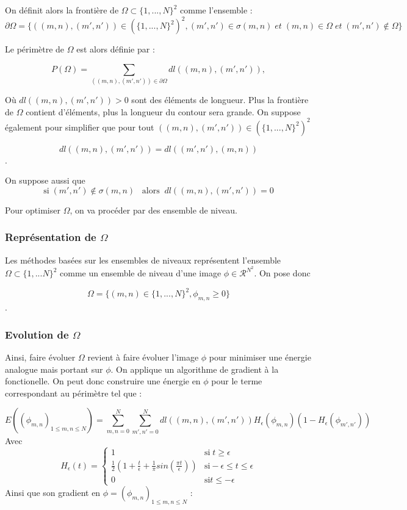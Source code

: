 On définit alors la frontière de $\Omega \subset \{ 1,...,N\}^2$ comme l'ensemble : 
\[ \partial \Omega = \{ ((m,n),(m',n')) \in (\{ 1,...,N\}^2)^2, (m',n') \in \sigma (m,n) \; et \; (m,n)\in \Omega \; et \; (m',n') \notin \Omega \}\] 

Le périmètre de $\Omega$ est alors définie par : 

\[ P(\Omega) = \sum \limits_{((m,n),(m',n')) \in \partial \Omega} dl((m,n),(m',n')),\] 

Où $ dl((m,n),(m',n')) > 0$ sont des éléments de longueur. Plus la frontière de $\Omega$ contient d'éléments, plus la longueur du contour sera grande. On suppose également pour simplifier que pour tout $((m,n), (m',n')) \in (\{ 1,...,N\}^2)^2$ 

\[ dl((m,n),(m',n')) = dl((m',n'),(m,n))\].

On suppose aussi que 
\[ \text{si} \; (m',n') \notin \sigma (m,n) \; \; \; \text{alors} \; \; dl((m,n),(m',n')) = 0\]

Pour optimiser $\Omega$, on va procéder par des ensemble de niveau.
 
\subsubsection{Représentation de \texorpdfstring{$\Omega$}{Lg}}

Les méthodes basées sur les ensembles de niveaux représentent l'ensemble $\Omega \subset \{1,...N\}^2$ comme un ensemble de niveau d'une image $\phi \in \mathcal{R}^{N^2}$. On pose donc 

\[ \Omega = \{ (m,n) \in \{1,...,N \}^2, \phi_{m,n} \geq 0 \} \].

\subsubsection{Evolution de \texorpdfstring{$\Omega$}{Lg}}

Ainsi, faire évoluer $\Omega$ revient à faire évoluer l'image $\phi$ pour minimiser une énergie analogue mais portant sur $\phi$. On applique un algorithme de gradient à la fonctionelle. On peut donc construire une énergie en $\phi$  pour le terme correspondant au  périmètre tel que : 

\[ E ((\phi_{m,n})_{1 \leq m,n \leq N}) = \sum \limits_{m,n = 0}^N  \sum \limits_{m',n' = 0}^N  dl((m,n),(m',n')) H_{\epsilon} (\phi_{m,n}) ( 1 - H_{\epsilon}(\phi_{m',n'})) \] 
Avec 
\[ H_{\epsilon} (t) = \left\{ \begin{matrix}
1 & \text{si} \; t \geq \epsilon \\
\frac{1}{2} (1 + \frac{t}{\epsilon} + \frac{1}{\pi}sin(\frac{\pi t}{\epsilon})) & \text{si} -\epsilon \leq t \leq \epsilon \\
0 & \text{si} t \leq - \epsilon 
\end{matrix} \right. \] 
Ainsi que son gradient en $\phi = (\phi_{m,n})_{1 \leq m,n \leq N}$ : 

